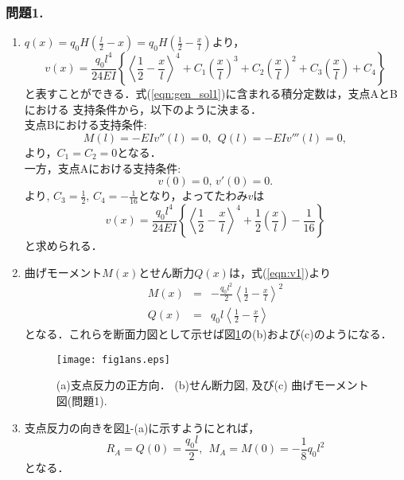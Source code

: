 \documentclass[10pt,a4j]{jarticle}
\begin{document}
\subsubsection*{問題1. }
\begin{enumerate}
\item
	$q(x)=q_0H\left(\frac{l}{2}-x\right)=q_0H\left(\frac{1}{2}-\frac{x}{l}\right)$より，
\begin{equation}
	v(x)=\frac{q_0l^4}{24EI}\left\{
			\left< \frac{1}{2} -\frac{x}{l} \right>^4
			+
			C_1\left(\frac{x}{l}\right)^3
			+
			C_2\left(\frac{x}{l}\right)^2
			+
			C_3\left(\frac{x}{l}\right)
			+
			C_4
		\right\}
		\label{eqn:gen_sol1}
\end{equation}
と表すことができる．式(\ref{eqn:gen_sol1})に含まれる積分定数は，支点AとBにおける
支持条件から，以下のように決まる．\\

支点Bにおける支持条件:
\begin{equation}
	M(l)=-EIv''(l) =0,
	\ \  
	Q(l)=-EIv'''(l) =0,
	\label{eqn:BC1_B}
\end{equation}
より，$C_1=C_2=0$となる．\\
一方，支点Aにおける支持条件:
\begin{equation}
	v(0) =0, \, v'(0)=0.
	\label{eqn:BC1_A}
\end{equation}
より, $C_3=\frac{1}{2},\, C_4=-\frac{1}{16}$となり，よってたわみ$v$は
\begin{equation}
	v(x)=\frac{q_0l^4}{24EI}\left\{
			\left< \frac{1}{2} -\frac{x}{l} \right>^4
			+
			\frac{1}{2}	
			\left(\frac{x}{l}\right)
			-
			\frac{1}{16}	
			\right\}
	\label{eqn:v1}
\end{equation}
と求められる．
\item
曲げモーメント$M(x)$とせん断力$Q(x)$は，式(\ref{eqn:v1})より
\begin{eqnarray}
	M(x) &=& 
		-\frac{q_0l^2}{2}
				\left< \frac{1}{2} -\frac{x}{l} \right>^2
	\label{eqn:M1}
	\\
	Q(x) &=&
		q_0l \left<\frac{1}{2} -\frac{x}{l}\right>
	\label{eqn:Q1}
\end{eqnarray}
となる．これらを断面力図として示せば図\ref{fig:fig1}の(b)および(c)のようになる．
\begin{figure}[h]
	\begin{center}
	\texttt{[image: fig1ans.eps]} 
	\end{center}
	\vspace{-5mm}
	\caption{(a)支点反力の正方向．
	(b)せん断力図, 及び(c) 曲げモーメント図(問題1).}
	\label{fig:fig1}
\end{figure}
\item
支点反力の向きを図\ref{fig:fig1}-(a)に示すようにとれば，
\begin{equation}
	R_A = Q(0) = \frac{q_0l}{2}, \ \ 
	M_A = M(0) = -\frac{1}{8}q_0l^2
\end{equation}
となる．
\end{enumerate}
\end{document}
